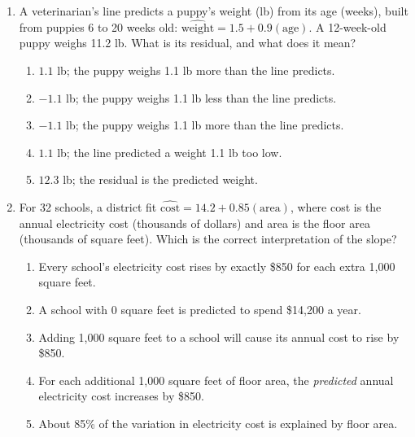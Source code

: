 \documentclass[12pt]{article}
\begin{document}
\begin{enumerate}[leftmargin=1.9em, itemsep=0.13in]
  \boxguard[9]
  \item A veterinarian's line predicts a puppy's weight (lb) from its age (weeks), built from
        puppies 6 to 20 weeks old: $\widehat{\text{weight}} = 1.5 + 0.9(\text{age})$. A
        12-week-old puppy weighs 11.2 lb. What is its residual, and what does it mean?
        \begin{enumerate}[label=\textbf{(\Alph*)}, leftmargin=2.2em, itemsep=2pt]
          \item $1.1$ lb; the puppy weighs 1.1 lb more than the line predicts.
          \item $-1.1$ lb; the puppy weighs 1.1 lb less than the line predicts.
          \item $-1.1$ lb; the puppy weighs 1.1 lb more than the line predicts.
          \item $1.1$ lb; the line predicted a weight 1.1 lb too low.
          \item $12.3$ lb; the residual is the predicted weight.\hfill{}\rule[-0.2in]{0pt}{0.48in}
        \end{enumerate}

  \boxguard[11]
  \item For 32 schools, a district fit
        $\widehat{\text{cost}} = 14.2 + 0.85(\text{area})$, where cost is the annual electricity
        cost (thousands of dollars) and area is the floor area (thousands of square feet).
        Which is the correct interpretation of the slope?
        \begin{enumerate}[label=\textbf{(\Alph*)}, leftmargin=2.2em, itemsep=2pt]
          \item Every school's electricity cost rises by exactly \$850 for each extra
                1{,}000 square feet.
          \item A school with 0 square feet is predicted to spend \$14{,}200 a year.
          \item Adding 1{,}000 square feet to a school will cause its annual cost to rise by
                \$850.
          \item For each additional 1{,}000 square feet of floor area, the \emph{predicted}
                annual electricity cost increases by \$850.
          \item About 85\% of the variation in electricity cost is explained by floor area.\hfill{}\rule[-0.2in]{0pt}{0.48in}
        \end{enumerate}


\end{enumerate}
\end{document}
